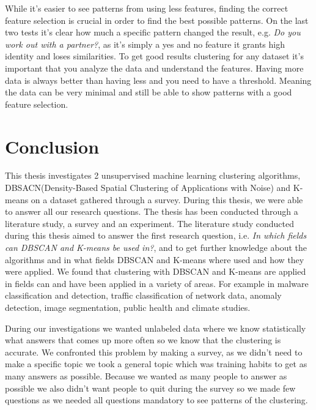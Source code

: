 \documentclass[a4paper]{article}
\begin{document}
While it's easier to see patterns from using less features, finding the correct feature selection is crucial in order to find the best possible patterns. On the last two tests it's clear how much a specific pattern changed the result, e.g. \textit{Do you work out with a partner?}, as it's simply a yes and no feature it grants high identity and loses similarities. To get good results clustering for any dataset it's important that you analyze the data and understand the features. Having more data is always  better than having less and you need to have a threshold. Meaning the data can be very minimal and still be able to show patterns with a good feature selection.


\newpage
\section{Conclusion}

This thesis investigates 2 unsupervised machine learning clustering algorithms, DBSACN(Density-Based Spatial Clustering of Applications with Noise) and K-means on a dataset gathered through a survey. 
During this thesis, we were able to answer all our research questions.  The thesis has been conducted through a literature study,  a survey and an experiment. The literature study conducted during this thesis aimed to answer the first research question, i.e. \textit{In which fields can DBSCAN and K-means be used in?}, and to get further knowledge about the algorithms and in what fields DBSCAN and K-means where used and how they were applied. We found that clustering with DBSCAN and K-means are applied in fields can and have been applied in a variety of areas. 
For example in malware classification and detection, traffic classification of network data, anomaly detection, image segmentation,  public health and climate studies.


During our investigations we wanted unlabeled data where we know statistically what answers that comes up more often so we know that the clustering is accurate. We confronted this problem by making a survey, as we didn't need to make a specific topic we took a general topic which was training habits to get as many answers as possible. Because we wanted as many people to answer as possible we also didn't want people to quit during the survey so we made few questions as we needed all questions mandatory to see patterns of the clustering.
\end{document}
